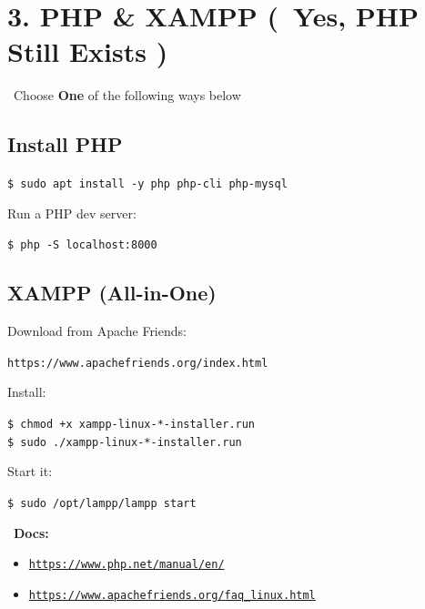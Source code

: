 \documentclass[12pt]{article}
\newcommand{\phpicon}{\faPhp}
\newcommand{\bookicon}{\faBook}
\newcommand{\computericon}{\faDesktop}
\begin{document}
\section*{3. PHP \& XAMPP (\phpicon\ Yes, PHP Still Exists \faSmile)}

\begin{infobox}
\computericon\ Choose \textbf{One} of the following ways below
\end{infobox}

\subsection*{Install PHP}

\begin{highlightbox}
\texttt{\$ sudo apt install -y php php-cli php-mysql}
\end{highlightbox}

Run a PHP dev server:

\begin{highlightbox}
\texttt{\$ php -S localhost:8000}
\end{highlightbox}

\subsection*{XAMPP (All-in-One)}

Download from Apache Friends:

\begin{highlightbox}
\texttt{https://www.apachefriends.org/index.html}
\end{highlightbox}

Install:

\begin{highlightbox}
\texttt{\$ chmod +x xampp-linux-*-installer.run}\\
\texttt{\$ sudo ./xampp-linux-*-installer.run}
\end{highlightbox}

Start it:

\begin{highlightbox}
\texttt{\$ sudo /opt/lampp/lampp start}
\end{highlightbox}

\begin{infobox}
\bookicon\ \textbf{Docs:}
\begin{itemize}
    \item \href{https://www.php.net/manual/en/}{\texttt{https://www.php.net/manual/en/}}
    \item \href{https://www.apachefriends.org/faq_linux.html}{\texttt{https://www.apachefriends.org/faq\_linux.html}}
\end{itemize}
\end{infobox}
\end{document}
